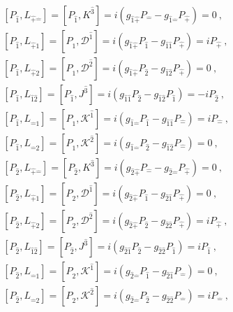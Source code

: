 \documentclass[12pt,a4paper]{report}
\begin{document}
    \begin{align*}
    &\left[P_{\hat{1}},L_{\hat{+}\hat{-}}\right]=\left[P_{\hat{1}},K^\hat{3}\right]=i\left(g_{\hat{1}\hat{+}}P_{\hat{-}}-g_{\hat{1}\hat{-}}P_{\hat{+}}\right)=0~,\\
    &\left[P_{\hat{1}},L_{\hat{+}\hat{1}}\right]=\left[P_{\hat{1}},\mathcal{D}^\hat{1}\right]=i\left(g_{\hat{1}\hat{+}}P_{\hat{1}}-g_{\hat{1}\hat{1}}P_{\hat{+}}\right)=iP_{\hat{+}}~,\\
    &\left[P_{\hat{1}},L_{\hat{+}\hat{2}}\right]=\left[P_{\hat{1}},\mathcal{D}^\hat{2}\right]=i\left(g_{\hat{1}\hat{+}}P_{\hat{2}}-g_{\hat{1}\hat{2}}P_{\hat{+}}\right)=0~,\\
    &\left[P_{\hat{1}},L_{\hat{1}\hat{2}}\right]=\left[P_{\hat{1}},J^\hat{3}\right]=i\left(g_{\hat{1}\hat{1}}P_{\hat{2}}-g_{\hat{1}\hat{2}}P_{\hat{1}}\right)=-iP_{\hat{2}}~,\\
    &\left[P_{\hat{1}},L_{\hat{-}\hat{1}}\right]=\left[P_{\hat{1}},\mathcal{K}^\hat{1}\right]=i\left(g_{\hat{1}\hat{-}}P_{\hat{1}}-g_{\hat{1}\hat{1}}P_{\hat{-}}\right)=iP_{\hat{-}}~,\\
    &\left[P_{\hat{1}},L_{\hat{-}\hat{2}}\right]=\left[P_{\hat{1}},\mathcal{K}^\hat{2}\right]=i\left(g_{\hat{1}\hat{-}}P_{\hat{2}}-g_{\hat{1}\hat{2}}P_{\hat{-}}\right)=0~,\\
    &\left[P_{\hat{2}},L_{\hat{+}\hat{-}}\right]=\left[P_{\hat{2}},K^\hat{3}\right]=i\left(g_{\hat{2}\hat{+}}P_{\hat{-}}-g_{\hat{2}\hat{-}}P_{\hat{+}}\right)=0~,\\
    &\left[P_{\hat{2}},L_{\hat{+}\hat{1}}\right]=\left[P_{\hat{2}},\mathcal{D}^\hat{1}\right]=i\left(g_{\hat{2}\hat{+}}P_{\hat{1}}-g_{\hat{2}\hat{1}}P_{\hat{+}}\right)=0~,\\
    &\left[P_{\hat{2}},L_{\hat{+}\hat{2}}\right]=\left[P_{\hat{2}},\mathcal{D}^\hat{2}\right]=i\left(g_{\hat{2}\hat{+}}P_{\hat{2}}-g_{\hat{2}\hat{2}}P_{\hat{+}}\right)=iP_{\hat{+}}~,\\
    &\left[P_{\hat{2}},L_{\hat{1}\hat{2}}\right]=\left[P_{\hat{2}},J^\hat{3}\right]=i\left(g_{\hat{2}\hat{1}}P_{\hat{2}}-g_{\hat{2}\hat{2}}P_{\hat{1}}\right)=iP_{\hat{1}}~,\\
    &\left[P_{\hat{2}},L_{\hat{-}\hat{1}}\right]=\left[P_{\hat{2}},\mathcal{K}^\hat{1}\right]=i\left(g_{\hat{2}\hat{-}}P_{\hat{1}}-g_{\hat{2}\hat{1}}P_{\hat{-}}\right)=0~,\\
    &\left[P_{\hat{2}},L_{\hat{-}\hat{2}}\right]=\left[P_{\hat{2}},\mathcal{K}^\hat{2}\right]=i\left(g_{\hat{2}\hat{-}}P_{\hat{2}}-g_{\hat{2}\hat{2}}P_{\hat{-}}\right)=iP_{\hat{-}}~,\\

\end{align*}
\end{document}
